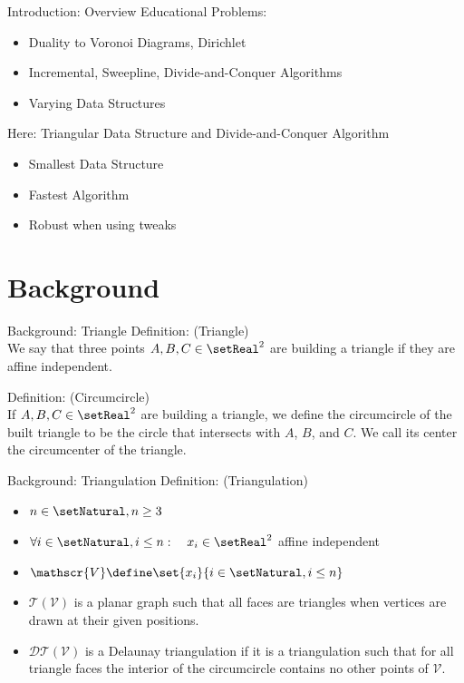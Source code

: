 \documentclass[aspectratio=169]{beamer}
\begin{document}
\begin{frame}{Introduction: Overview}
  Educational Problems:
  \begin{itemize}
    \item Duality to Voronoi Diagrams, Dirichlet
    \item Incremental, Sweepline, Divide-and-Conquer Algorithms
    \item Varying Data Structures
  \end{itemize}
  \bigskip
  Here: Triangular Data Structure and Divide-and-Conquer Algorithm
  \begin{itemize}
    \item Smallest Data Structure
    \item Fastest Algorithm
    \item Robust when using tweaks
  \end{itemize}
\end{frame}

\section{Background}
\begin{frame}{Background: Triangle}
  Definition: (Triangle)\\
  We say that three points $A, B, C \in \setReal^2$ are building a triangle if they are affine independent.
  \bigskip

  Definition: (Circumcircle)\\
  If $A, B, C \in \setReal^2$ are building a triangle, we define the circumcircle of the built triangle to be the circle that intersects with $A$, $B$, and $C$.
  We call its center the circumcenter of the triangle.
\end{frame}

\begin{frame}{Background: Triangulation}
  Definition: (Triangulation)
  \begin{itemize}
    \item $n\in\setNatural, n\geq 3$
    \item $\forall i\in\setNatural, i \leq n: \quad x_i \in \setReal^2$ affine independent
    \item $\mathscr{V}\define \set{x_i}{i\in\setNatural, i \leq n}$
    \item $\mathscr{T}(\mathscr{V})$ is a planar graph such that all faces are triangles when vertices are drawn at their given positions.
    \item $\mathscr{DT}(\mathscr{V})$ is a Delaunay triangulation if it is a triangulation such that for all triangle faces the interior of the circumcircle contains no other points of $\mathscr{V}$.
  \end{itemize}
\end{frame}
\end{document}

